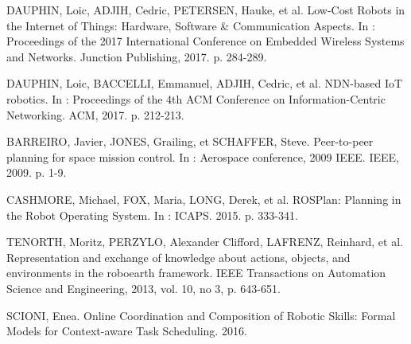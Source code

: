 
DAUPHIN, Loic, ADJIH, Cedric, PETERSEN, Hauke, et al. 
Low-Cost Robots in the Internet of Things: Hardware, Software \& Communication Aspects. 
In : Proceedings of the 2017 International Conference on Embedded Wireless Systems and Networks. Junction Publishing, 2017. p. 284-289.

DAUPHIN, Loic, BACCELLI, Emmanuel, ADJIH, Cedric, et al. 
NDN-based IoT robotics. 
In : Proceedings of the 4th ACM Conference on Information-Centric Networking. ACM, 2017. p. 212-213.

BARREIRO, Javier, JONES, Grailing, et SCHAFFER, Steve. 
Peer-to-peer planning for space mission control. 
In : Aerospace conference, 2009 IEEE. IEEE, 2009. p. 1-9.

CASHMORE, Michael, FOX, Maria, LONG, Derek, et al. 
ROSPlan: Planning in the Robot Operating System. 
In : ICAPS. 2015. p. 333-341.

TENORTH, Moritz, PERZYLO, Alexander Clifford, LAFRENZ, Reinhard, et al. 
Representation and exchange of knowledge about actions, objects, and environments in the roboearth framework. 
IEEE Transactions on Automation Science and Engineering, 2013, vol. 10, no 3, p. 643-651.

SCIONI, Enea. 
Online Coordination and Composition of Robotic Skills: Formal Models for Context-aware Task Scheduling. 
2016.

